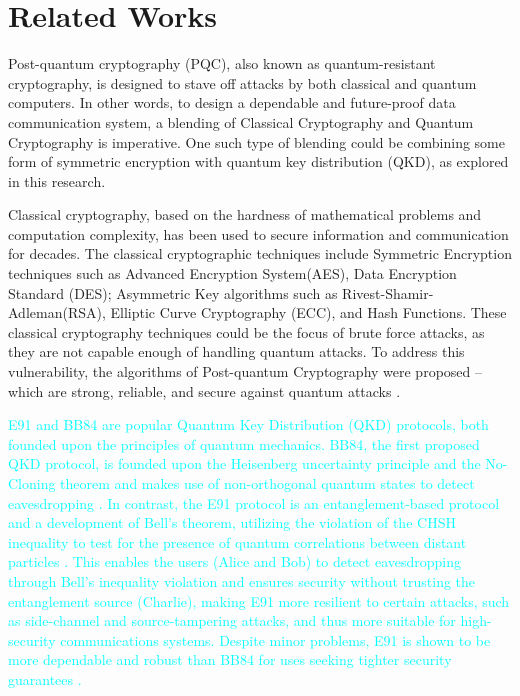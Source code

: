 \documentclass[a4paper]{cas-sc}
\begin{document}
\section{Related Works}
\label{sec:relatedWorks}
Post-quantum cryptography (PQC), also known as quantum-resistant cryptography, is designed to stave off attacks
by both classical and quantum computers. In other words, to design a dependable and future-proof data communication
system, a blending of Classical Cryptography and Quantum Cryptography is imperative. One such type of blending
could be combining some form of symmetric encryption with quantum key distribution (QKD), as explored in this research.

Classical cryptography, based on the hardness of mathematical problems and computation complexity, has been used to secure information and communication for decades. The classical cryptographic techniques include Symmetric Encryption techniques such as Advanced Encryption System(AES), Data Encryption Standard (DES); Asymmetric Key algorithms such as Rivest-Shamir-Adleman(RSA), Elliptic Curve Cryptography (ECC), and Hash Functions. These classical cryptography techniques could be the focus of brute force attacks, as they are not capable enough of handling quantum attacks. To address this vulnerability, the algorithms of Post-quantum Cryptography were proposed -- which are strong, reliable, and secure against quantum attacks \cite{sharma2023post}.

\textcolor{cyan}{E91 and BB84 are popular Quantum Key Distribution (QKD) protocols, both founded upon the principles of quantum mechanics. BB84, the first proposed QKD protocol, is founded upon the Heisenberg uncertainty principle and the No-Cloning theorem and makes use of non-orthogonal quantum states to detect eavesdropping \cite{bennett2014quantum}. In contrast, the E91 protocol is an entanglement-based protocol and a development of Bell's theorem, utilizing the violation of the CHSH inequality to test for the presence of quantum correlations between distant particles \cite{Ekert1991}. This enables the users (Alice and Bob) to detect eavesdropping through Bell's inequality violation and ensures security without trusting the entanglement source (Charlie), making E91 more resilient to certain attacks, such as side-channel and source-tampering attacks, and thus more suitable for high-security communications systems. Despite minor problems, E91 is shown to be more dependable and robust than BB84 for uses seeking tighter security guarantees \cite{alvarez2016comparison}.}
\end{document}
